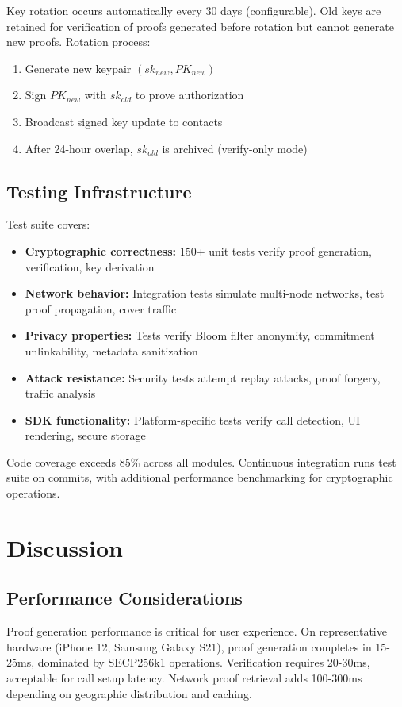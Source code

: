 \documentclass[11pt,twocolumn]{article}
\begin{document}
Key rotation occurs automatically every 30 days (configurable). Old keys are retained for verification of proofs generated before rotation but cannot generate new proofs. Rotation process:
\begin{enumerate}
\item Generate new keypair $(sk_{new}, PK_{new})$
\item Sign $PK_{new}$ with $sk_{old}$ to prove authorization
\item Broadcast signed key update to contacts
\item After 24-hour overlap, $sk_{old}$ is archived (verify-only mode)
\end{enumerate}

\subsection{Testing Infrastructure}

Test suite covers:
\begin{itemize}
\item \textbf{Cryptographic correctness:} 150+ unit tests verify proof generation, verification, key derivation
\item \textbf{Network behavior:} Integration tests simulate multi-node networks, test proof propagation, cover traffic
\item \textbf{Privacy properties:} Tests verify Bloom filter anonymity, commitment unlinkability, metadata sanitization
\item \textbf{Attack resistance:} Security tests attempt replay attacks, proof forgery, traffic analysis
\item \textbf{SDK functionality:} Platform-specific tests verify call detection, UI rendering, secure storage
\end{itemize}

Code coverage exceeds 85\% across all modules. Continuous integration runs test suite on commits, with additional performance benchmarking for cryptographic operations.

\section{Discussion}

\subsection{Performance Considerations}

Proof generation performance is critical for user experience. On representative hardware (iPhone 12, Samsung Galaxy S21), proof generation completes in 15-25ms, dominated by SECP256k1 operations. Verification requires 20-30ms, acceptable for call setup latency. Network proof retrieval adds 100-300ms depending on geographic distribution and caching.
\end{document}

